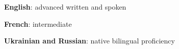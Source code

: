 
\begin{cventries}
  \cventry
    {\vspace{-20pt}}
    {}
    {}
    {}
    {
      \begin{cvitems} %
        \item{\textbf{English}: advanced written and spoken}
		\item{\textbf{French}: intermediate}
		\item{\textbf{Ukrainian and Russian}: native bilingual proficiency}
      \end{cvitems}
    }

\end{cventries}

